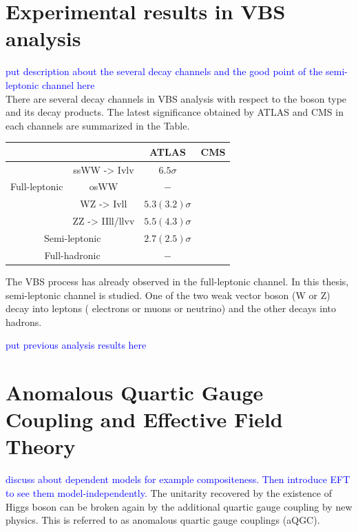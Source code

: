 \section{Experimental results in VBS analysis}
\textcolor{blue}{put description about the several decay channels and the good point of the semi-leptonic channel here}　\\
There are several decay channels in VBS analysis with respect to the boson type and its decay products. The latest significance obtained by ATLAS and CMS in each channels are summarized in the Table.

\begin{tabular}{|c|c|c|c|}
\hline \multicolumn{2}{|c|}{}                                   & ATLAS             & CMS\\
\hline
\hline \multirow{3}{*}{ Full-leptonic }      & ssWW -> Ivlv     & $6.5      \sigma$ &    \\
\cline { 2 - 4 }                             & osWW             & $-$               &    \\
\cline { 2 - 4 }                             & WZ -> Ivll       & $5.3(3.2) \sigma$ &    \\
\cline { 2 - 4 }                             & ZZ -> IIll/llvv  & $5.5(4.3) \sigma$ &    \\
\hline \multicolumn{2}{|c|}{ Semi-leptonic }                    & $2.7(2.5) \sigma$ &    \\
\hline \multicolumn{2}{|c|}{ Full-hadronic }                    & $-$               &    \\
\hline
\end{tabular}

The VBS process has already observed in the full-leptonic channel.
In this thesis, semi-leptonic channel is studied. One of the two weak vector boson (W or Z) decay into leptons ( electrons or muons or neutrino) and the other decays into hadrons.

\textcolor{blue}{put previous analysis results here}

\section{Anomalous Quartic Gauge Coupling and Effective Field Theory}

\textcolor{blue}{discuss about dependent models for example compositeness. Then introduce EFT to see them model-independently.}
The unitarity recovered by the existence of Higgs boson can be broken again by the additional quartic gauge coupling by new physics. This is referred to as anomalous quartic gauge couplings (aQGC). 

